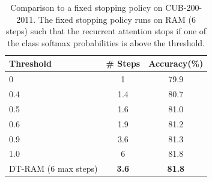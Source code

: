 \documentclass[10pt,twocolumn,letterpaper]{article}
\begin{document}
\begin{table}
  \centering
  \addtolength{\tabcolsep}{2.5pt}
    \begin{tabular}{l c c}
      \toprule[0.2 em]
      Threshold & \# Steps & Accuracy(\%) \\
      \toprule[0.2 em]
      0 & 1 & 79.9 \\
      0.4 & 1.4 & 80.7\\
      0.5 & 1.6 & 81.0\\
      0.6 & 1.9 & 81.2\\
      0.9 & 3.6 & 81.3\\
      1.0 & 6 & 81.8\\
      \midrule
      DT-RAM (6 max steps) & {\bf 3.6} & {\bf 81.8} \\
      \bottomrule[0.1 em]
    \end{tabular}
    \vspace{1pt}
    \caption{Comparison to a fixed stopping policy on CUB-200-2011. The fixed stopping policy runs on RAM (6 steps) such that the recurrent attention stops if one of the class softmax probabilities is above the threshold.}
    \label{tab:bird_threshold}
\end{table}
\end{document}
